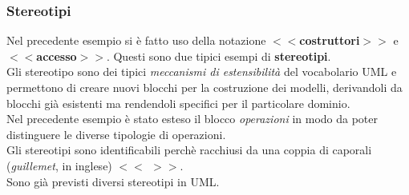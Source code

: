 \documentclass{article}
\begin{document}
	\subsubsection{Stereotipi}
	Nel precedente esempio si è fatto uso della notazione \textbf{$<<$costruttori$>>$} e \textbf{$<<$accesso$>>$}. Questi sono due tipici esempi di \textbf{stereotipi}.
	\vspace{\baselineskip} \\
	Gli stereotipo sono dei tipici \textit{meccanismi di estensibilità} del vocabolario UML e permettono di creare nuovi blocchi per la costruzione dei modelli, derivandoli da blocchi già esistenti ma rendendoli specifici per il particolare dominio.
	\vspace{\baselineskip} \\
	Nel precedente esempio è stato esteso il blocco \textit{operazioni} in modo da poter distinguere le diverse tipologie di operazioni.
	\vspace{\baselineskip} \\
	Gli stereotipi sono identificabili perchè racchiusi da una coppia di caporali (\textit{guillemet}, in inglese) \textbf{$<<$ $>>$}. \\
	Sono già previsti diversi stereotipi in UML.
\end{document}
